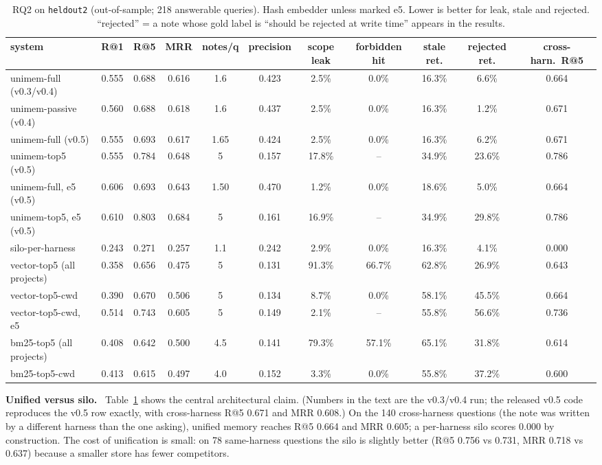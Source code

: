 \documentclass[10pt,twocolumn]{article}
\newcommand{\code}[1]{\texttt{\small #1}}
\newcommand{\para}[1]{\smallskip\noindent\textbf{#1}\ }
\begin{document}
\begin{table}[t]
\centering\small
\caption{RQ2 on \code{heldout2} (out-of-sample; 218 answerable queries). Hash embedder unless marked e5. Lower is better
for leak, stale and rejected. ``rejected'' = a note whose gold label is ``should be rejected at write time'' appears in the
results.}
\label{tab:e1}
\setlength{\tabcolsep}{3.6pt}
\begin{tabular}{@{}lcccccccccc@{}}
\toprule
system & R@1 & R@5 & MRR & notes/q & precision & scope leak & forbidden hit & stale ret. & rejected ret. & cross-harn.\ R@5 \\
\midrule
\rowcolor{ours} unimem-full (v0.3/v0.4) & 0.555 & 0.688 & 0.616 & 1.6 & 0.423 & 2.5\% & 0.0\% & 16.3\% & 6.6\% & 0.664 \\
unimem-passive (v0.4) & 0.560 & 0.688 & 0.618 & 1.6 & 0.437 & 2.5\% & 0.0\% & 16.3\% & 1.2\% & 0.671 \\
unimem-full (v0.5) & 0.555 & 0.693 & 0.617 & 1.65 & 0.424 & 2.5\% & 0.0\% & 16.3\% & 6.2\% & 0.671 \\
unimem-top5 (v0.5) & 0.555 & 0.784 & 0.648 & 5 & 0.157 & 17.8\% & -- & 34.9\% & 23.6\% & 0.786 \\
unimem-full, e5 (v0.5) & 0.606 & 0.693 & 0.643 & 1.50 & 0.470 & 1.2\% & 0.0\% & 18.6\% & 5.0\% & 0.664 \\
unimem-top5, e5 (v0.5) & 0.610 & 0.803 & 0.684 & 5 & 0.161 & 16.9\% & -- & 34.9\% & 29.8\% & 0.786 \\
\midrule
silo-per-harness & 0.243 & 0.271 & 0.257 & 1.1 & 0.242 & 2.9\% & 0.0\% & 16.3\% & 4.1\% & 0.000 \\
vector-top5 (all projects) & 0.358 & 0.656 & 0.475 & 5 & 0.131 & 91.3\% & 66.7\% & 62.8\% & 26.9\% & 0.643 \\
vector-top5-cwd & 0.390 & 0.670 & 0.506 & 5 & 0.134 & 8.7\% & 0.0\% & 58.1\% & 45.5\% & 0.664 \\
vector-top5-cwd, e5 & 0.514 & 0.743 & 0.605 & 5 & 0.149 & 2.1\% & -- & 55.8\% & 56.6\% & 0.736 \\
bm25-top5 (all projects) & 0.408 & 0.642 & 0.500 & 4.5 & 0.141 & 79.3\% & 57.1\% & 65.1\% & 31.8\% & 0.614 \\
bm25-top5-cwd & 0.413 & 0.615 & 0.497 & 4.0 & 0.152 & 3.3\% & 0.0\% & 55.8\% & 37.2\% & 0.600 \\
\bottomrule
\end{tabular}
\end{table}

\para{Unified versus silo.} Table~\ref{tab:e1} shows the central architectural claim. (Numbers in the text are the v0.3/v0.4 run;
the released v0.5 code reproduces the v0.5 row exactly, with cross-harness R@5 0.671 and MRR 0.608.) On the 140 cross-harness
questions (the note was written by a different harness than the one asking), unified memory reaches R@5 0.664 and MRR
0.605; a per-harness silo scores 0.000 by construction. The cost of unification is small: on 78 same-harness questions
the silo is slightly better (R@5 0.756 vs 0.731, MRR 0.718 vs 0.637) because a smaller store has fewer competitors.
\end{document}
